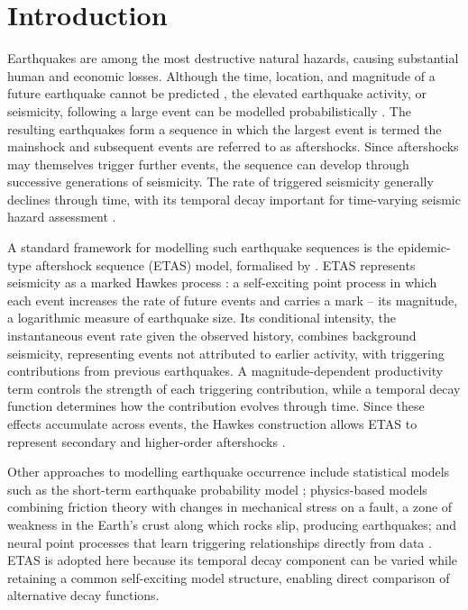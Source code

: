 \documentclass{statsmsc}
\begin{document}
\section{Introduction} \label{sec:intro}

Earthquakes are among the most destructive natural hazards, causing substantial human and economic losses. Although the time, location, and magnitude of a future earthquake cannot be predicted \citep{geller1997earthquakes}, the elevated earthquake activity, or seismicity, following a large event can be modelled probabilistically \citep{Reasenberg1989}. The resulting earthquakes form a sequence in which the largest event is termed the mainshock and subsequent events are referred to as aftershocks. Since aftershocks may themselves trigger further events, the sequence can develop through successive generations of seismicity. The rate of triggered seismicity generally declines through time, with its temporal decay important for time-varying seismic hazard assessment \citep{hainzl2017testing}.

A standard framework for modelling such earthquake sequences is the epidemic-type aftershock sequence (ETAS) model, formalised by \citet{ogata1988statistical}. ETAS represents seismicity as a marked Hawkes process \citep{hawkes1971spectra}: a self-exciting point process in which each event increases the rate of future events and carries a mark -- its magnitude, a logarithmic measure of earthquake size. Its conditional intensity, the instantaneous event rate given the observed history, combines background seismicity, representing events not attributed to earlier activity, with triggering contributions from previous earthquakes. A magnitude-dependent productivity term controls the strength of each triggering contribution, while a temporal decay function determines how the contribution evolves through time. Since these effects accumulate across events, the Hawkes construction allows ETAS to represent secondary and higher-order aftershocks \citep{omi2015intermediate}.

Other approaches to modelling earthquake occurrence include statistical models such as the short-term earthquake probability model \citep{Gerstenberger2005}; physics-based models \citep{dieterich1994constitutive} combining friction theory with changes in mechanical stress on a fault, a zone of weakness in the Earth's crust along which rocks slip, producing earthquakes; and neural point processes that learn triggering relationships directly from data \citep{stockman2023forecasting, stockman2026earthquakenpp}. ETAS is adopted here because its temporal decay component can be varied while retaining a common self-exciting model structure, enabling direct comparison of alternative decay functions.
\end{document}
